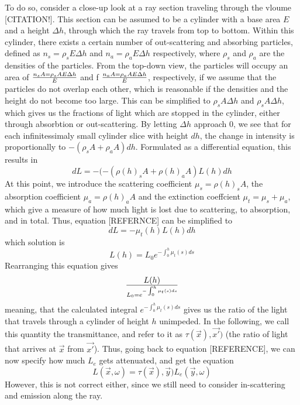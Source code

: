To do so, consider a close-up look at a ray section traveling through the vloume [CITATION!].
This section can be assumed to be a cylinder with a base area $E$ and a height $\Delta h$, through which the ray travels from top to bottom.
Within this cylinder, there exists a certain number of out-scattering and absorbing particles, defined as $n_s={\rho}_sE{\Delta}h$ and $n_a={\rho}_aE{\Delta}h$ respectively, where ${\rho}_s$ and ${\rho}_a$ are the densities of the particles.
From the top-down view, the particles will occupy an area of $n_sA={\rho}_sAE{\Delta}h \over E$ and f $n_aA={\rho}_aAE{\Delta}h \over E$, respectively, if we assume that the particles do not overlap each other, which is reasonable if the densities and the height do not become too large.
This can be simplified to ${\rho}_sA{\Delta}h$ and ${\rho}_sA{\Delta}h$, which gives us the fractions of light which are stopped in the cylinder, either through absorbtion or out-scattering. By letting $\Delta h$ approach 0, we see that for each infinitessimaly small cylinder slice with height $dh$, the change in intensity is proportionally to $-({\rho}_sA + {\rho}_aA)dh$.
Formulated as a differential equation, this results in
\begin{equation}
dL = -(-({\rho}(h)_sA + {\rho}(h)_aA)L(h)dh
\end{equation}
At this point, we introduce the scattering coefficient ${\mu}_s ={\rho}(h)_sA $, the absorption coefficient ${\mu}_a = {\rho}(h)_aA$ and the extinction coeffcient ${\mu}_t = {\mu}_s +{\mu}_a$, which give a measure of how much light is lost due to scattering, to absorption, and in total. Thus, equation [REFERNCE] can be simplified to
\begin{equation}
dL = - {\mu}_t(h)L(h)dh
\end{equation}
which solution is
\begin{equation}
L(h) = L_0e^{-\int_{0}^{h} {\mu}_t(s)ds}
\end{equation}
Rearranging this equation gives
\begin{equation}
L(h) \over{L_0} = e^{-\int_{0}^{h} {\mu}_t(s)ds}
\end{equation}
meaning, that the calculated integral $e^{-\int_{0}^{h} {\mu}_t(s)ds}$ gives us the ratio of the light that travels through a cylinder of height $h$ unimpeded. In the following, we call this quantity the transmittance, and refer to it as $\tau(\vec{x}), \vec{x'})$ (the ratio of light that arrives at $\vec{x}$ from $\vec{x'}$).
Thus, going back to equation [REFERENCE], we can now specify how much $L_e$ gets attenuated, and get the equation
\begin{equation}
L(\vec{x},\omega ) =\tau(\vec{x}), \vec{y}) L_e(\vec{y}, \omega )
\end{equation}
However, this is not correct either, since we still need to consider in-scattering and emission along the ray.
